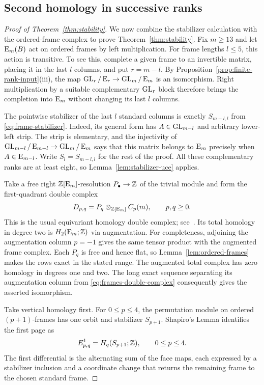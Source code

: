 \subsection{Second homology in successive ranks}

\begin{proof}[Proof of Theorem~\ref{thm:stability}]
We now combine the stabilizer calculation with the ordered-frame
complex to prove Theorem~\ref{thm:stability}. Fix $m\geq13$ and let
$\operatorname{E}_m(B)$ act on ordered frames by left multiplication.
For frame lengths $l\leq5$, this action is transitive. To see this,
complete a given frame to an invertible matrix, placing it in the
last $l$ columns, and put $r=m-l$. By
Proposition~\ref{prop:finite-rank-input}\textup{(iii)}, the map
$\operatorname{GL}_r/\operatorname{E}_r\to\operatorname{GL}_m/\operatorname{E}_m$ is an isomorphism. Right multiplication
by a suitable complementary $\operatorname{GL}_r$ block therefore brings the
completion into $\operatorname{E}_m$ without changing its last $l$ columns.

The pointwise stabilizer of the last $l$ standard columns is exactly
$S_{m-l,l}$ from \eqref{eq:frame-stabilizer}. Indeed, its general
form has $A\in\operatorname{GL}_{m-l}$ and arbitrary lower-left strip. The strip
is elementary, and the injectivity of
$\operatorname{GL}_{m-l}/\operatorname{E}_{m-l}\to\operatorname{GL}_m/\operatorname{E}_m$ says that this matrix belongs
to $\operatorname{E}_m$ precisely when $A\in\operatorname{E}_{m-l}$. Write $S_l=S_{m-l,l}$
for the rest of the proof. All these complementary ranks are at
least eight, so Lemma~\ref{lem:stabilizer-uce} applies.

Take a free right $\mathbb Z[\operatorname{E}_m]$-resolution $P_\bullet\to\mathbb Z$ of the
trivial module and form the first-quadrant double complex
\begin{equation}\label{eq:frames-double-complex}
 D_{p,q}=P_q\otimes_{\mathbb Z[\operatorname{E}_m]}C_p(m),\qquad p,q\geq0.
\end{equation}
This is the usual equivariant homology double complex;
see~\cite[Chapter~VII]{Brown}.
Its total homology in degree two is $H_2(\operatorname{E}_m;\mathbb Z)$ via augmentation.
For completeness, adjoining the augmentation column $p=-1$ gives
the same tensor product with the augmented frame complex. Each
$P_q$ is free and hence flat, so
Lemma~\ref{lem:ordered-frames} makes the rows exact in the stated
range. The augmented total complex has zero homology in degrees
one and two. The long exact sequence separating its augmentation
column from \eqref{eq:frames-double-complex} consequently gives
the asserted isomorphism.

Take vertical homology first. For $0\leq p\leq4$, the permutation
module on ordered $(p+1)$-frames has one orbit and stabilizer
$S_{p+1}$. Shapiro's Lemma identifies the first page as
\begin{equation}\label{eq:frames-first-page}
 E^1_{p,q}=H_q(S_{p+1};\mathbb Z),\qquad 0\leq p\leq4.
\end{equation}
The first differential is the alternating sum of the face maps,
each expressed by a stabilizer inclusion and a coordinate change
that returns the remaining frame to the chosen standard frame.


\end{proof}
